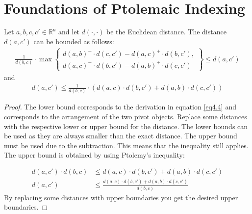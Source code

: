 \section{Foundations of Ptolemaic Indexing}


\begin{theorem}
\label{thm4.2}
    Let \(a, b, c, c' \in \mathbb{R}^n\) and let \(d(\cdot, \cdot)\) be the Euclidean distance. The distance \(d(a, c')\) can be bounded as follows:
    \begin{gather}
        \frac{1}{d(b, c)} \cdot \max \left\{
        \begin{array}{l}
            d(a, b)^- \cdot d(c, c') - d(a, c)^+ \cdot d(b, c'), \\
            d(a, c)^- \cdot d(b, c') - d(a, b)^+ \cdot d(c, c')
        \end{array}
        \right\} \leq d(a, c')
    \end{gather}
    and
    \begin{gather}
        d(a, c') \leq \frac{1}{d(b, c)} \cdot \left( d(a, c) \cdot d(b, c') + d(a, b) \cdot d(c, c') \right)
    \end{gather}
\end{theorem}
\begin{proof}
    The lower bound corresponds to the derivation in equation \ref{eq4.4} and corresponds to the arrangement of the two pivot objects. Replace some distances with the respective lower or upper bound for the distance. The lower bounds can be used as they are always smaller than the exact distance. The upper bound must be used due to the subtraction. This means that the inequality still applies. The upper bound is obtained by using Ptolemy's inequality:

    \begin{equation*}
\begin{aligned}
\label{eq4.7}
    d(a,c') \cdot d(b,c) &\leq d(a, c) \cdot d(b, c') + d(a, b) \cdot d(c, c') \\
    d(a,c') &\leq \frac{d(a, c) \cdot d(b, c') + d(a, b) \cdot d(c, c')}{d(b,c)}
\end{aligned}
\end{equation*}
    By replacing some distances with upper boundaries you get the desired upper boundaries.
\end{proof}




